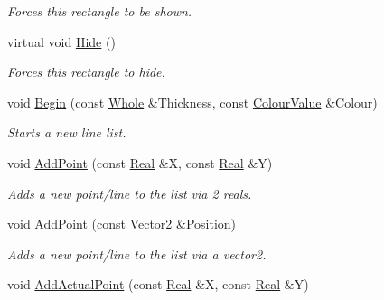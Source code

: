 \begin{DoxyCompactItemize}
\begin{DoxyCompactList}\small\item\em Forces this rectangle to be shown. \item\end{DoxyCompactList}\item 
\hypertarget{classphys_1_1UI_1_1LineList_a4e1d09adc4ed6947d93ae6030e00263e}{
virtual void \hyperlink{classphys_1_1UI_1_1LineList_a4e1d09adc4ed6947d93ae6030e00263e}{Hide} ()}
\label{classphys_1_1UI_1_1LineList_a4e1d09adc4ed6947d93ae6030e00263e}

\begin{DoxyCompactList}\small\item\em Forces this rectangle to hide. \item\end{DoxyCompactList}\item 
void \hyperlink{classphys_1_1UI_1_1LineList_adb0f29fc8f83baeec9f36f4e99e04a53}{Begin} (const \hyperlink{namespacephys_a460f6bc24c8dd347b05e0366ae34f34a}{Whole} \&Thickness, const \hyperlink{classphys_1_1ColourValue}{ColourValue} \&Colour)
\begin{DoxyCompactList}\small\item\em Starts a new line list. \item\end{DoxyCompactList}\item 
void \hyperlink{classphys_1_1UI_1_1LineList_a9e706df0f3c6419b64cf136b688fe5aa}{AddPoint} (const \hyperlink{namespacephys_af7eb897198d265b8e868f45240230d5f}{Real} \&X, const \hyperlink{namespacephys_af7eb897198d265b8e868f45240230d5f}{Real} \&Y)
\begin{DoxyCompactList}\small\item\em Adds a new point/line to the list via 2 reals. \item\end{DoxyCompactList}\item 
void \hyperlink{classphys_1_1UI_1_1LineList_a586b848c2eeebeead80d3f5f3fd05ad5}{AddPoint} (const \hyperlink{classphys_1_1Vector2}{Vector2} \&Position)
\begin{DoxyCompactList}\small\item\em Adds a new point/line to the list via a vector2. \item\end{DoxyCompactList}\item 
void \hyperlink{classphys_1_1UI_1_1LineList_a2bb72fa96c9ed9ea64c78eb8286fd713}{AddActualPoint} (const \hyperlink{namespacephys_af7eb897198d265b8e868f45240230d5f}{Real} \&X, const \hyperlink{namespacephys_af7eb897198d265b8e868f45240230d5f}{Real} \&Y)

\end{DoxyCompactItemize}
